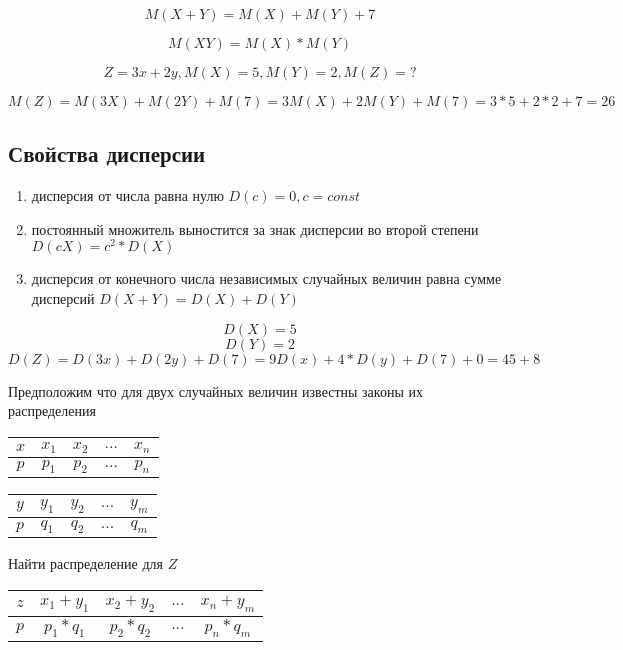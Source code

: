 \documentclass[a4paper]{article}
\begin{document}
$$ M(X + Y) = M(X) + M(Y) + 7$$
        
$$ M(XY) = M(X)*M(Y)$$
    
$$Z = 3x + 2y, M(X) = 5, M(Y) = 2, M(Z) = ?$$

$$ M(Z) = M(3X) + M(2Y) + M(7)= 3M(X) + 2M(Y) + M(7) = 3*5 + 2*2 + 7 = 26$$

\subsection{Свойства дисперсии}

\begin{enumerate}
    \item дисперсия от числа равна нулю $ D(c) = 0, c = const$
    \item постоянный множитель выностится за знак дисперсии во второй степени $D(cX) = c^2 * D(X)$
    \item дисперсия от конечного числа независимых случайных величин равна сумме дисперсий
    $D(X + Y) = D(X) + D(Y)$
\end{enumerate}

$$ D(X) = 5$$
$$ D(Y) = 2$$
$$ D(Z) = D(3x) + D(2y) + D(7) = 9D(x) + 4*D(y) + D(7) + 0 = 45 + 8$$ 

Предположим что для двух случайных величин известны законы их распределения

\begin{table}[H]
\centering
\begin{tabular}{|c|c|c|c|c|}
\hline
$x$ & $x_1$ & $x_2$ & $...$ & $x_n$ \\
\hline
$p$ & $p_1$ & $p_2$ & $...$ & $p_n$ \\
\hline
\end{tabular}
\end{table}

\begin{table}[H]
\centering
\begin{tabular}{|c|c|c|c|c|}
\hline
$y$ & $y_1$ & $y_2$ & $...$ & $y_m$ \\
\hline
$p$ & $q_1$ & $q_2$ & $...$ & $q_m$ \\
\hline
\end{tabular}
\end{table}

Найти распределение для $Z$

\begin{table}[H]
\centering
\begin{tabular}{|c|c|c|c|c|}
\hline
$z$ & $x_1 + y_1$ & $x_2 + y_2$ & $...$ & $x_n + y_m$ \\
\hline
$p$ & $p_1 * q_1$ & $p_2 * q_2$ & $...$ & $p_n * q_m$ \\
\hline
\end{tabular}
\end{table}
    
\end{document}
